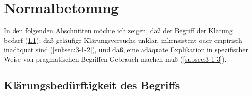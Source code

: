 \documentclass[output=paper]{langsci/langscibook}
\begin{document}
\section{Normalbetonung}
\label{sec:3-1}

In den folgenden Abschnitten möchte ich zeigen, daß der Begriff
 der Klärung bedarf (\ref{subsec:3-1-1}); daß geläufige
Klärungsversuche unklar, inkonsistent oder empirisch inadäquat sind
(\ref{subsec:3-1-2}), und daß, eine adäquate Explikation in spezifischer Weise von
pragmatischen Begriffen Gebrauch machen muß (\ref{subsec:3-1-3}).

\subsection{Klärungsbedürftigkeit des Begriffs}
\label{subsec:3-1-1}
\end{document}
